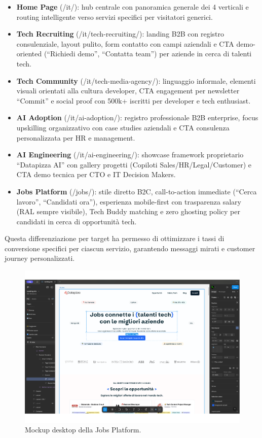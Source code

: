 \begin{itemize}
  \item \textbf{Home Page} (/it/): hub centrale con panoramica generale dei 
  4 verticali e routing intelligente verso servizi specifici per visitatori generici.
  
  \item \textbf{Tech Recruiting} (/it/tech-recruiting/): landing B2B con registro 
  consulenziale, layout pulito, form contatto con campi aziendali e CTA demo-oriented 
  (``Richiedi demo'', ``Contatta team'') per aziende in cerca di talenti tech.
  
  \item \textbf{Tech Community} (/it/tech-media-agency/): linguaggio informale, 
  elementi visuali orientati alla cultura developer, CTA engagement per newsletter 
  ``Commit'' e social proof con 500k+ iscritti per developer e tech enthusiast.
  
  \item \textbf{AI Adoption} (/it/ai-adoption/): registro professionale B2B 
  enterprise, focus upskilling organizzativo con case studies aziendali e CTA 
  consulenza personalizzata per HR e management.
  
  \item \textbf{AI Engineering} (/it/ai-engineering/): showcase framework 
  proprietario ``Datapizza AI'' con gallery progetti (Copiloti Sales/HR/Legal/Customer) 
  e CTA demo tecnica per CTO e IT Decision Makers.
  
  \item \textbf{Jobs Platform} (/jobs/): stile diretto B2C, call-to-action 
  immediate (``Cerca lavoro'', ``Candidati ora''), esperienza mobile-first con 
  trasparenza salary (RAL sempre visibile), Tech Buddy matching e zero ghosting 
  policy per candidati in cerca di opportunità tech.
\end{itemize}

Questa differenziazione per target ha permesso di ottimizzare i tassi di 
conversione specifici per ciascun servizio, garantendo messaggi mirati e 
customer journey personalizzati.

\begin{figure}[h!]
    \centering
    \includegraphics[width=1.06\textwidth]{chapters/figures/mockup.pdf}
    \caption{Mockup desktop della Jobs Platform.}
    \label{fig:jobs-desktop}
\end{figure}

